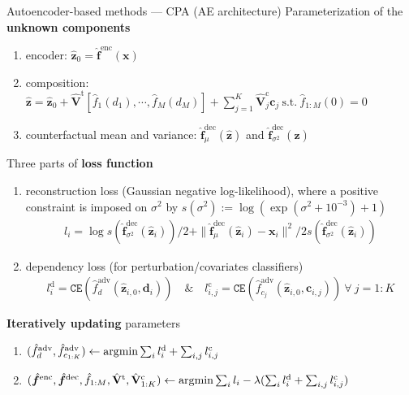 \documentclass[10pt]{beamer}
\begin{document}
\begin{frame}{Autoencoder-based methods --- \normalsize CPA (AE architecture)}
    Parameterization of the \textbf{unknown components}
    \begin{enumerate}\small
        \item encoder: $\hat{\bm{z}}_0 = \hat{\bm{f}}^\text{enc}(\bm{x})$
        \item composition: $\hat{\bm{z}} = \hat{\bm{z}}_0 + \hat{\mathbf{V}}^\text{t}[\hat{f}_1(d_1),\cdots,\hat{f}_M(d_M)] + \sum_{j=1}^K\hat{\mathbf{V}}^\text{c}_j\bm{c}_j \ \text{s.t.}\ \hat{f}_{1:M}(0) = 0$
        \item counterfactual mean and variance: $\hat{\bm{f}}^\text{dec}_\mu(\hat{\bm{z}})$ and $ \hat{\bm{f}}^\text{dec}_{\sigma^2}(\hat{\bm{z}})$
    \end{enumerate}
    \medskip
    Three parts of \textbf{loss function}
    \begin{enumerate}\small
        \item reconstruction loss (Gaussian negative log-likelihood), 
        where a positive constraint is imposed on $\sigma^2$ by $s(\sigma^2):=\log(\exp(\sigma^2+10^{-3})+1)$
        \begin{gather}
            l_i 
            = \log s(\hat{\bm{f}}^\text{dec}_{\sigma^2}(\hat{\bm{z}}_i))/2 
            + \|\hat{\bm{f}}^\text{dec}_\mu(\hat{\bm{z}}_i)-\bm{x}_i\|^2/2s(\hat{\bm{f}}^\text{dec}_{\sigma^2}(\hat{\bm{z}}_i))
        \end{gather}
        \item dependency loss (for perturbation/covariates classifiers)
        \begin{gather}
            l_i^\text{d} 
            = \texttt{CE}(\hat{f}^\text{adv}_d(\hat{\bm{z}}_{i,0},\bm{d}_i))\quad \& \quad
            l_{i,j}^\text{c} 
            = \texttt{CE}(\hat{f}^\text{adv}_{c_j}(\hat{\bm{z}}_{i,0},\bm{c}_{i,j}))\ \forall\ j=1:K
        \end{gather}
    \end{enumerate}
    \medskip
    \textbf{Iteratively updating} parameters
    \begin{enumerate}\small
        \item $(\hat{f}^\text{adv}_d, \hat{f}^\text{adv}_{c_{1:K}})\gets\operatorname*{\arg\!min} \sum_{i}l_i^\text{d}+\sum_{i,j}l_{i,j}^\text{c}$
        \item $(\hat{\bm{f}}^\text{enc},\hat{\bm{f}}^\text{dec},\hat{f}_{1:M},\hat{\mathbf{V}}^\text{t},\hat{\mathbf{V}}^\text{c}_{1:K})\gets\operatorname*{\arg\!min} \sum_{i}l_i-\lambda(\sum_{i}l_i^\text{d}+\sum_{i,j}l_{i,j}^\text{c})$
    \end{enumerate}
\end{frame}
\end{document}
